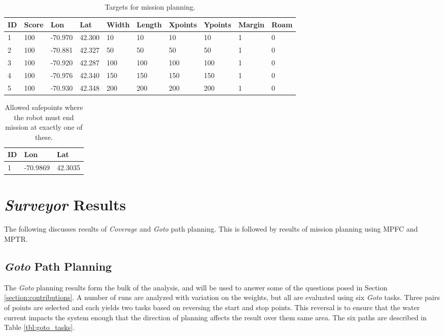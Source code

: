 \documentclass{tamuccthesis}
\begin{document}
\begin{table}[H]\small
    \centering
    \begin{tabular}{|l|l|l|l|l|l|l|l|l|l|}
    \hline
    ID & Score & Lon & Lat & Width & Length & Xpoints & Ypoints & Margin & Roam \\
    \hline
    1 & 100 & -70.970 & 42.300 & 10 & 10 & 10 & 10 & 1 & 0 \\
    \hline
    2 & 100 & -70.881 & 42.327 & 50 & 50 & 50 & 50 & 1 & 0 \\
    \hline
    3 & 100 & -70.920 & 42.287 & 100 & 100 & 100 & 100 & 1 & 0 \\
    \hline
    4 & 100 & -70.976 & 42.340 & 150 & 150 & 150 & 150 & 1 & 0 \\
    \hline
    5 & 100 & -70.930 & 42.348 & 200 & 200 & 200 & 200 & 1 & 0 \\
    \hline  
        
    \end{tabular}
    \caption[Targets for mission planning.]{Targets for mission planning.}
    \label{tbl:targets}
\end{table}



\begin{table}[H]\small
    \centering
    \begin{tabular}{|l|l|l|}
    \hline
    ID & Lon & Lat\\
    \hline
    1 & -70.9869 & 42.3035 \\
    \hline  
    \end{tabular}
    \caption[Robot safepoints.]{Allowed safepoints where the robot must end mission at exactly one of these.}
    \label{tbl:safepoints}
\end{table}

\section{\textit{Surveyor} Results}

The following discusses results of \textit{Coverage} and \textit{Goto} path planning. This is followed by results of mission planning using MPFC and MPTR. 

\subsection{\textit{Goto} Path Planning}

The \textit{Goto} planning results form the bulk of the analysis, and will be used to answer some of the questions posed in Section \ref{section:contributions}. A number of runs are analyzed with variation on the weights, but all are evaluated using six \textit{Goto} tasks. Three pairs of points are selected and each yields two tasks based on reversing the start and stop points. This reversal is to ensure that the water current impacts the system enough that the direction of planning affects the result over them same area. The six paths are described in Table \ref{tbl:goto_tasks}.
\end{document}
